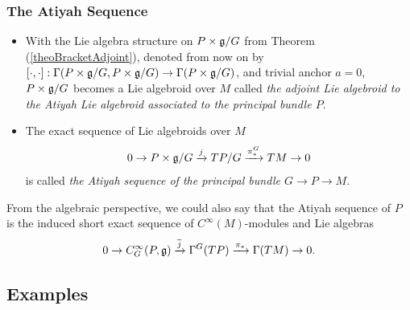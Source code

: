 \subsubsection{The Atiyah Sequence}
\begin{definition}\label{definitionAtiyahSequencePrincipalBundleVectorBundle}
    \begin{itemize}
    
    \item With the Lie algebra structure on $P \times \mathfrak{g}/G$ from Theorem (\ref{theoBracketAdjoint}), denoted from now on by $[\cdot, \cdot]: \Gamma(P \times \mathfrak{g}/G, P \times \mathfrak{g}/G) \to \Gamma(P \times \mathfrak{g}/G)$, and trivial anchor $a=0$, $P \times \mathfrak{g}/G$ becomes a Lie algebroid over $M$ called \emph{the adjoint Lie algebroid to the Atiyah Lie algebroid associated to the principal bundle $P$}.
    
    \item The exact sequence of Lie algebroids over $M$
\begin{align} \label{definitionAtiyahSequencePrincipalBundleVectorBundleuence}
    0 \to P \times \mathfrak{g}/G \xrightarrow{j} TP/G \xrightarrow{\pi_*^G} TM \to 0
\end{align}
is called \emph{the Atiyah sequence of the principal bundle $G \to P \to M$}.
    \end{itemize}

From the algebraic perspective, we could also say that the Atiyah sequence of $P$ is the induced short exact sequence of $C^\infty(M)$-modules and Lie algebras
\begin{align} \label{equationdefinitionAtiyahSequencePrincipalBundleVectorBundleuencePrincipalBundleSectionsSequence}
    0 \to C^\infty_G(P, \mathfrak{g}) \xrightarrow{\overline{j}} \Gamma^G(TP) \xrightarrow{\pi_*} \Gamma(TM) \to 0.
\end{align}

\end{definition}

\subsection{Examples}

